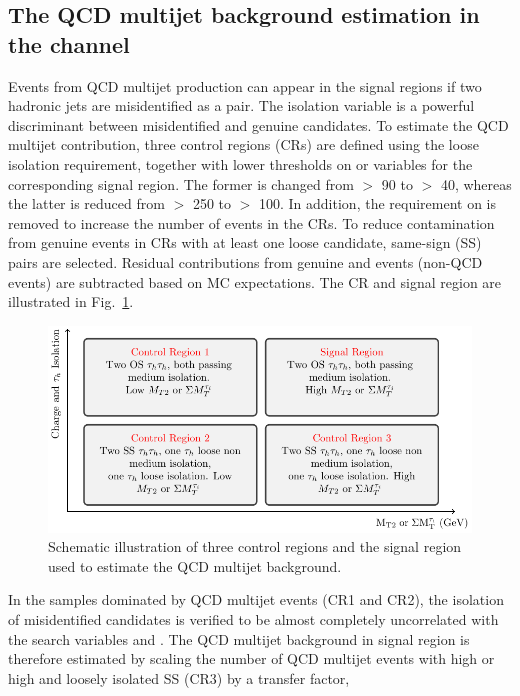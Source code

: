 \subsection{\texorpdfstring{The QCD multijet background estimation in the \tauTau channel}{The QCD multijet background estimation in the tau-tau channel}}
\label{sect:bkgQCD}
Events from QCD multijet production can appear in the signal regions if two hadronic jets are misidentified as a \tauTau pair.
The isolation variable is a powerful discriminant between misidentified and genuine \Tau candidates. To estimate the QCD multijet contribution, three \tauTau control regions (CRs) are defined using the loose \Tau isolation requirement, together with lower thresholds on \mttwo or \SumMT variables for the corresponding signal region. The former is changed from \mttwo $>$ 90 to $>$ 40\GeV, whereas the latter is reduced from \SumMT $>$ 250 to $>$ 100\GeV. In addition, the requirement on \deltaphi is removed to increase the number of events in the CRs. 
To reduce contamination from genuine \tauTau events 
in CRs with at least one loose \Tau candidate, 
same-sign (SS) \tauTau pairs are selected. Residual contributions from genuine 
\tauTau and \wjets events (non-QCD events) are subtracted based on MC expectations. 
The CR and signal region are illustrated in Fig.~\ref{fig:ABCDQCD}. 
\begin{figure}[!htb]
\centering
\includegraphics[angle=0,scale=1.15]{Bkg/ABCD.pdf}
\caption{Schematic illustration of three control regions and the signal region used to estimate the QCD multijet background.}
\label{fig:ABCDQCD}
\end{figure}
In the samples dominated by QCD multijet events (CR1 and CR2), the isolation of misidentified \Tau candidates is verified 
to be almost completely uncorrelated with the search variables \mttwo and \SumMT.
The QCD multijet background in signal region is therefore estimated by scaling the number of QCD multijet events with high \mttwo or high \SumMT and loosely isolated SS \tauTau (CR3) by a transfer factor, 
